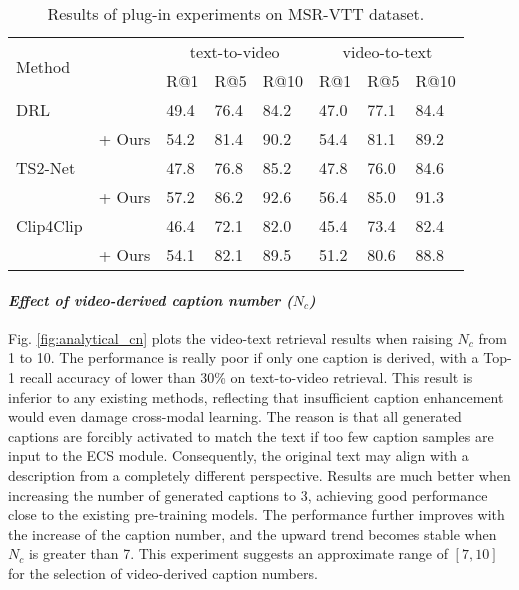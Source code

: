 \begin{table}[t]
    \centering
     \caption{Results of plug-in experiments on MSR-VTT dataset.}
     \vspace{-0.8em}
   \begin{tabular}{l|p{1.5em}<{\centering}p{1.5em}<{\centering}p{2.2em}<{\centering}|p{1.5em}<{\centering}p{1.5em}<{\centering}p{2.2em}<{\centering}}
        \toprule
        \multirow{2}{*}{Method}  &  \multicolumn{3}{c|}{text-to-video}   & \multicolumn{3}{c}{video-to-text}   \\
        \cline{2-7}
           & R@1 &  R@5&  R@10 & R@1 &  R@5 &  R@10      \\

        \midrule
        DRL \cite{wang2022disentangled}  & 49.4 & 76.4 & 84.2 & 47.0 & 77.1 & 84.4 \\
        ~~~~~~~~ ~ + Ours & 54.2 & 81.4 & 90.2 & 54.4 & 81.1 & 89.2 \\
         
         \midrule  
        TS2-Net \cite{liu2022ts2}  & 47.8 & 76.8 & 85.2 & 47.8 & 76.0 & 84.6 \\
        ~~~~~~~~ ~ + Ours & 57.2 & 86.2 & 92.6 & 56.4 & 85.0 & 91.3  \\
        
        \midrule  
        Clip4Clip \cite{luo2022clip4clip}  & 46.4  & 72.1 &  82.0 &  45.4 &  73.4  & 82.4 \\
        ~~~~~~~~ ~ + Ours & 54.1 & 82.1 & 89.5 & 51.2 & 80.6 & 88.8 \\

         \bottomrule
    \end{tabular}
    
    \label{tab:plug-in}
\end{table}


\paragraph{\textit{Effect of video-derived caption number ($N_c$)}}
Fig. \ref{fig:analytical_cn} plots the video-text retrieval results when raising $N_c$ from 1 to 10. The performance is really poor if only one caption is derived, with a Top-1 recall accuracy of lower than 30\% on text-to-video retrieval. This result is inferior to any existing methods, reflecting that insufficient caption enhancement would even damage cross-modal learning. The reason is that all generated captions are forcibly activated to match the text if too few caption samples are input to the ECS module. Consequently, the original text may align with a description from a completely different perspective.
Results are much better when increasing the number of generated captions to 3, achieving good performance close to the existing pre-training models. The performance further improves with the increase of the caption number, and the upward trend becomes stable when $N_c$ is greater than 7. This experiment suggests an approximate range of $[7,10]$ for the selection of video-derived caption numbers. 



